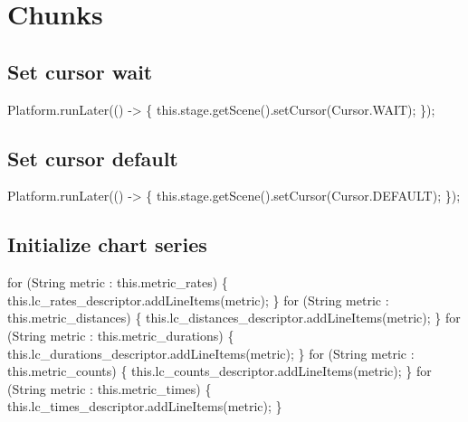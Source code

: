 \section{Chunks}
\subsection{Set cursor wait}
\nwenddocs{}\endmoddef{}
Platform.runLater(() -> \{
  this.stage.getScene().setCursor(Cursor.WAIT);
\});
\nwendcode{}\nwdocspar

\subsection{Set cursor default}
\nwenddocs{}\endmoddef{}
Platform.runLater(() -> \{
  this.stage.getScene().setCursor(Cursor.DEFAULT);
\});
\nwendcode{}\nwdocspar

\subsection{Initialize chart series}
\nwenddocs{}\endmoddef{}
for (String metric : this.metric_rates) \{
  this.lc_rates_descriptor.addLineItems(metric);
\}
for (String metric : this.metric_distances) \{
  this.lc_distances_descriptor.addLineItems(metric);
\}
for (String metric : this.metric_durations) \{
  this.lc_durations_descriptor.addLineItems(metric);
\}
for (String metric : this.metric_counts) \{
  this.lc_counts_descriptor.addLineItems(metric);
\}
for (String metric : this.metric_times) \{
  this.lc_times_descriptor.addLineItems(metric);
\}
\nwendcode{}\nwdocspar

